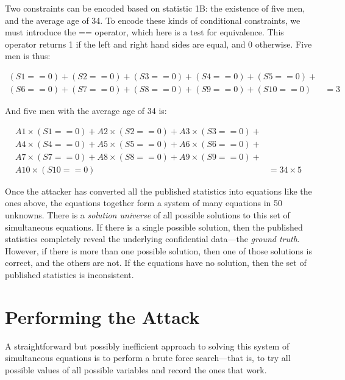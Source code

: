 \documentclass[runningheads]{llncs}
\begin{document}
Two constraints can be encoded based on statistic 1B: the existence of
five men, and the average age of 34. To encode these kinds of
conditional constraints, we must introduce the == operator,
which here is a test for equivalence. This operator returns 1 if the
left and right hand sides are equal, and 0 otherwise.
Five men is thus:

\begin{equation}
\begin{split}
(S1==0) + (S2==0) + (S3==0) + (S4==0) + (S5==0) +  & \\
(S6==0) + (S7==0) + (S8==0) + (S9==0) + (S10==0) & = 3
\end{split}
\end{equation}

And five men with the average age of 34 is:

\begin{equation}
\begin{split}
A1\times(S1==0) + A2\times(S2==0) + A3\times(S3==0) + &\\
A4\times(S4==0) + A5\times(S5==0) + A6\times(S6==0) + &\\
A7\times(S7==0) + A8\times(S8==0) + A9\times(S9==0) + &\\
                                    A10\times(S10==0) & = 34\times5
\end{split}
\end{equation}

Once the attacker has converted all the published statistics
into equations like the ones above, the equations together form a
system of many equations in 50 unknowns.
There is a \textit{solution universe} of all possible solutions to
this set of simultaneous equations. If there is a single possible
solution, then the published statistics completely reveal the
underlying confidential data---the \emph{ground truth}. However, if
there is more than one possible solution, then one of those solutions
is correct, and the others are not. If the equations have no solution,
then the set of published statistics is inconsistent.

\section{Performing the Attack}
A straightforward but possibly inefficient approach to solving this
system of simultaneous equations is to perform a brute force
search---that is, to try all possible values of all possible variables
and record the ones that work.
\end{document}
